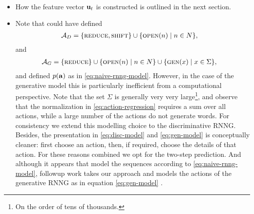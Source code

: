 \begin{itemize}
  \item How the feature vector $\mathbf{u}_t$ is constructed is outlined in the next section.

  \item Note that could have defined
  \begin{align*}
    \mathcal{A}_D &= \{ \textsc{reduce}, \textsc{shift} \} \cup \{ \textsc{open}(n) \mid n \in N \},
  \end{align*}
  and
  \begin{align*}
    \mathcal{A}_G &= \{ \textsc{reduce} \} \cup \{ \textsc{open}(n) \mid n \in N \} \cup \{ \textsc{gen}(x) \mid x \in \Sigma \},
  \end{align*}
  and defined $p(\mathbf{a})$ as in \ref{eq:naive-rnng-model}. However, in the case of the generative model this is particularly inefficient from a computational perspective. Note that the set $\Sigma$ is generally very very large\footnote{On the order of tens of thousands.}, and observe that the normalization in \ref{eq:action-regression} requires a sum over all actions, while a large number of the actions do not generate words. For consistency we extend this modelling choice to the discriminative RNNG. Besides, the presentation in \ref{eq:disc-model} and \ref{eq:gen-model} is conceptually cleaner: first choose an action, then, if required, choose the details of that action. For these reasons combined we opt for the two-step prediction. And although it appears that \citet{dyer2016rnng} model the sequences according to \ref{eq:naive-rnng-model}, followup work takes our approach and models the actions of the generative RNNG as in equation \ref{eq:gen-model} \citep{hale2018beam}.

\end{itemize}

